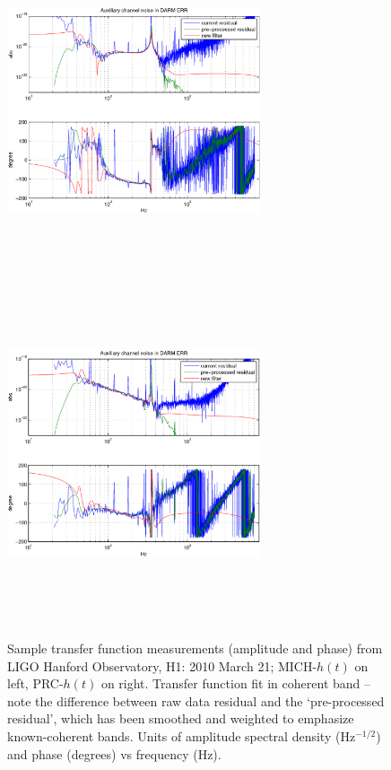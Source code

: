 \begin{figure}
\begin{center}
\includegraphics[height=100mm, width=75mm]{figure3a.eps}
\includegraphics[height=100mm, width=75mm]{figure3b.eps}
\caption{Sample transfer function measurements (amplitude and phase) from LIGO Hanford Observatory, H1: 2010 March 21; MICH-$h(t)$ on left, PRC-$h(t)$ on right. Transfer function fit in coherent band -- note the difference between raw data residual and the `pre-processed residual', which has been smoothed and weighted to emphasize known-coherent bands. Units of amplitude spectral density (Hz$^{-1/2}$) and phase (degrees) vs frequency (Hz).}
\label{tfGraph}
\end{center}
\end{figure}
